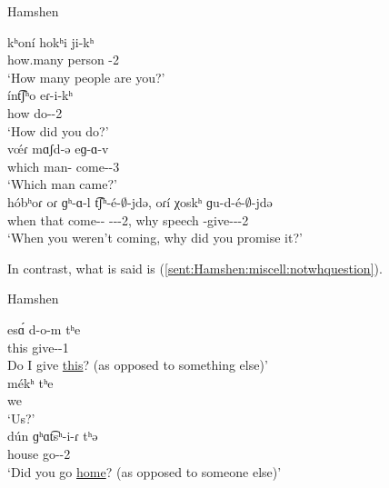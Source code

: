 \begin{exe}
	\ex Hamshen \label{sent:Hamshen:miscell:whquestion}
	\begin{xlist}
		\ex \gll kʰon\'i hokʰi ji-kʰ \\
		how.many person {\aux}-2{\pl} \\
		\trans `How many people are you?' \\
		\ex \gll \'int͡ʃʰo eɾ-i-kʰ \\
		how do-{\pst}-2{\pl} \\
		\trans `How did you do?' \\
		\ex \gll v\'œɾ mɑʃd-ə eɡ-ɑ-v \\
		which man-{} come-{\pst}-3{\sg} \\
		\trans `Which man came?' \\
		\ex \gll h\'obʰoɾ oɾ ɡʰ-ɑ-l t͡ʃʰ-\'e-$\emptyset$-jdə, oɾ\'i χoskʰ ɡu-d-\'e-$\emptyset$-jdə \\
		when that come-{\thgloss}-{\cn} {\neggloss}-{\aux}-{\pst}-2{\sg}, why speech {\ind}-give-{\thgloss}-{\pst}-2{\sg} \\
		\trans `When you weren't coming, why did you promise it?' \\
		
	\end{xlist}
\end{exe}





In contrast, what is said is (\ref{sent:Hamshen:miscell:notwhquestion}). 

\begin{exe}
	\ex Hamshen\label{sent:Hamshen:miscell:notwhquestion}
	\begin{xlist}
		\ex \gll es\'ɑ d-o-m tʰe \\
		this give-{\thgloss}-1{\sg} {\q} \\
		\trans Do I give \underline{this}? (as opposed to something else)' \\
		\armenian{էսա՞ դօմ թէ}
		\ex \gll m\'ekʰ tʰe \\
		we {\q} \\
		\trans `Us?' \\
		\armenian{մէ՞ք թէ}
		\ex \gll d\'un ɡʰɑt͡sʰ-i-ɾ tʰə \\
		house go-{\pst}-2{\sg} {\q} \\
		\trans `Did you go \underline{home}? (as opposed to someone else)'\\
		
		
	\end{xlist}
\end{exe}

